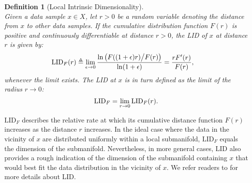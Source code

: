 \documentclass{article}
\newtheorem{definition}{Definition}
\begin{document}
\begin{definition}[Local Intrinsic Dimensionality] \quad \\
Given a data sample $x \in X$, let $r>0$ be a random variable denoting the distance from $x$ to other data samples. If the cumulative distribution function $F(r)$ is positive and continuously differentiable at distance $r>0$, the LID of $x$ at distance $r$ is given by:
\begin{equation} \label{eq:LID_r}
  \begin{split}
    \textup{LID}_F(r) & \triangleq \lim_{\epsilon\to 0} \frac{\ln\big(F((1+\epsilon) r)\big/F(r)\big)}{\ln(1+\epsilon)} 
     = \frac{r F'(r)}{F(r)},
  \end{split}
\end{equation}
whenever the limit exists.
\label{def:lid}
The \textup{LID} at $x$ is in turn defined as the limit of the radius $r \to 0$: 
\begin{equation} \label{eq:LID}
    \textup{LID}_F = \lim_{r \to 0}  \textup{LID}_F(r).
\end{equation}
\end{definition}
$\text{LID}_F$ describes the relative rate at which its cumulative distance function $F(r)$ increases as the distance $r$ increases. In the ideal case where the data in the vicinity of $x$ are distributed uniformly within a local submanifold, $\text{LID}_F$ equals the dimension of the submanifold. Nevertheless, in more general cases, LID also provides a rough indication of the dimension of the submanifold containing $x$ that would best fit the data distribution in the vicinity of $x$. 
 We refer readers to \cite{houle2017local1,houle2017local2} for more details about LID.
\end{document}
